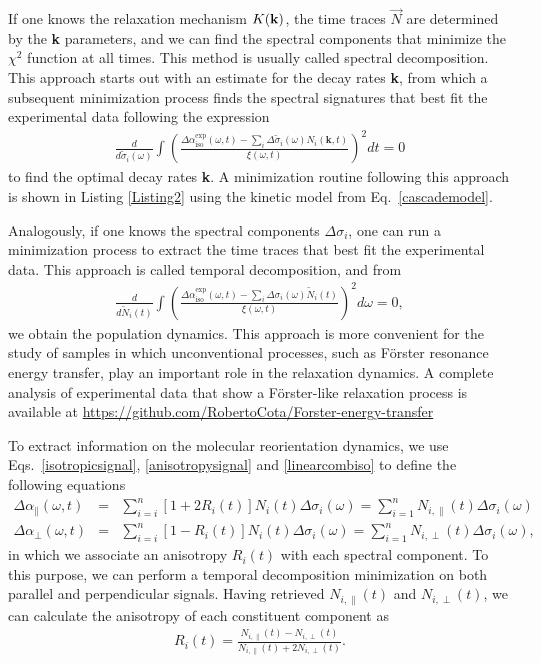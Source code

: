 If one knows the relaxation mechanism $K(\text{\textbf{k}})$, the time traces $\vec{N}$ are determined by the \textbf{k} parameters, and we can find the spectral components that minimize the $\chi^2$ function at all times. This method is usually called spectral decomposition. This approach starts out with an estimate for the decay rates \textbf{k}, from which a subsequent minimization process finds the spectral signatures that best fit the experimental data following the expression
\begin{eqnarray}
\frac{d}{d \tilde{\sigma}_i (\omega)} \int \left( \frac{\Delta \alpha_\text{iso}^\text{exp} (\omega,t) - \sum_i \Delta\tilde{\sigma}_i(\omega)N_i(\textbf{k},t)}{\xi (\omega, t)}\right)^2 dt = 0
\label{SpectralDecomp}
\end{eqnarray}
to find the optimal decay rates \textbf{k}. A minimization routine following this approach is shown in Listing \ref{Listing2} using the kinetic model from Eq.\ \ref{cascademodel}.


Analogously, if one knows the spectral components $\Delta\sigma_i$, one can run a minimization process to extract the time traces that best fit the experimental data. This approach is called temporal decomposition, and from
\begin{eqnarray}
\frac{d}{d \tilde{N}_i (t)} \int \left( \frac{\Delta \alpha_\text{iso}^\text{exp} (\omega,t) - \sum_i \Delta\sigma_i(\omega) \tilde{N}_i(t)}{\xi (\omega, t)}\right)^2 d\omega = 0,
\label{TemporalDecomp}
\end{eqnarray}
we obtain the population dynamics. This approach is more convenient for the study of samples in which unconventional processes, such as F\"orster resonance energy transfer,\!\cite{Forster1948} play an important role in the relaxation dynamics. A complete analysis of experimental data that show a F\"orster-like relaxation process is available at \href{https://github.com/RobertoCota/Forster-energy-transfer}{https://github.com/RobertoCota/Forster-energy-transfer}

To extract information on the molecular reorientation dynamics, we use Eqs.\ \ref{isotropicsignal}, \ref{anisotropysignal} and \ref{linearcombiso} to define the following equations
\begin{eqnarray}
\Delta \alpha_\parallel (\omega, t) &=& \sum_{i=i}^n [1 + 2 R_i(t)] N_i (t) \Delta\sigma_i(\omega) = \sum_{i=1}^n N_{i,\parallel} (t) \Delta\sigma_i (\omega) \\
\Delta \alpha_\perp (\omega, t) &=& \sum_{i=i}^n [1 -  R_i(t)] N_i (t) \Delta\sigma_i(\omega) = \sum_{i=1}^n N_{i,\perp} (t) \Delta\sigma_i (\omega),
\end{eqnarray}
in which we associate an anisotropy $R_i (t)$ with each spectral component. To this purpose, we can perform a temporal decomposition minimization on both parallel and perpendicular signals. Having retrieved $N_{i,\parallel} (t)$ and $N_{i,\perp} (t)$, we can calculate the anisotropy of each constituent component as
\begin{eqnarray}
R_i(t) = \frac{N_{i,\parallel} (t) - N_{i,\perp} (t)}{ N_{i,\parallel} (t) + 2 N_{i,\perp} (t)}.
\end{eqnarray}

